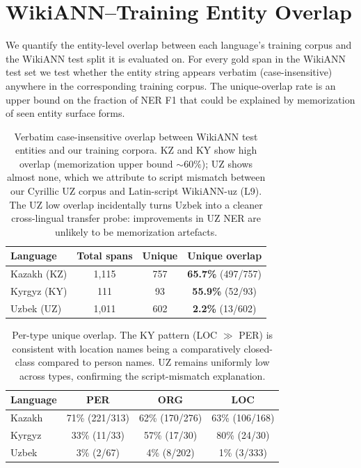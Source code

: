 \documentclass[11pt]{article}
\begin{document}
\section{WikiANN--Training Entity Overlap}
\label{app:overlap}

We quantify the entity-level overlap between each language's training corpus and the WikiANN test split it is evaluated on. For every gold span in the WikiANN test set we test whether the entity string appears verbatim (case-insensitive) anywhere in the corresponding training corpus. The unique-overlap rate is an upper bound on the fraction of NER F1 that could be explained by memorization of seen entity surface forms.

\begin{table}[!htbp]
\centering
\small
\begin{tabular}{lccc}
\toprule
\textbf{Language} & \textbf{Total spans} & \textbf{Unique} & \textbf{Unique overlap} \\
\midrule
Kazakh (KZ)  & 1{,}115 & 757 & \textbf{65.7\%} (497/757) \\
Kyrgyz (KY)  & 111     & 93  & \textbf{55.9\%} (52/93) \\
Uzbek (UZ)   & 1{,}011 & 602 & \textbf{2.2\%}  (13/602) \\
\bottomrule
\end{tabular}
\caption{Verbatim case-insensitive overlap between WikiANN test entities and our training corpora. KZ and KY show high overlap (memorization upper bound $\sim 60\%$); UZ shows almost none, which we attribute to script mismatch between our Cyrillic UZ corpus and Latin-script WikiANN-uz (L9). The UZ low overlap incidentally turns Uzbek into a cleaner cross-lingual transfer probe: improvements in UZ NER are unlikely to be memorization artefacts.}
\label{tab:overlap}
\end{table}

\begin{table}[!htbp]
\centering
\small
\begin{tabular}{lccc}
\toprule
\textbf{Language} & \textbf{PER} & \textbf{ORG} & \textbf{LOC} \\
\midrule
Kazakh & 71\% (221/313) & 62\% (170/276) & 63\% (106/168) \\
Kyrgyz & 33\% (11/33)   & 57\% (17/30)   & 80\% (24/30)   \\
Uzbek  & 3\% (2/67)     & 4\% (8/202)    & 1\% (3/333)    \\
\bottomrule
\end{tabular}
\caption{Per-type unique overlap. The KY pattern (LOC $\gg$ PER) is consistent with location names being a comparatively closed-class compared to person names. UZ remains uniformly low across types, confirming the script-mismatch explanation.}
\label{tab:overlap_per_type}
\end{table}
\end{document}

